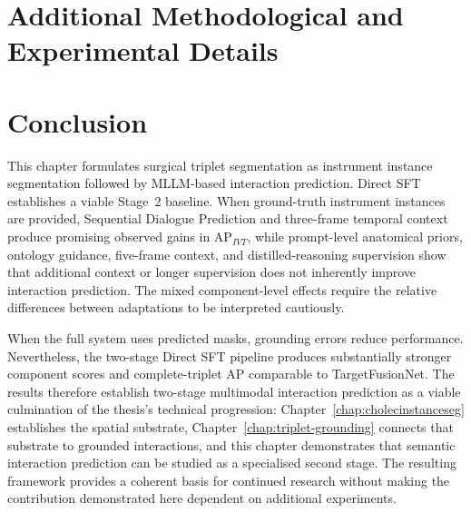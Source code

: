 \section{Additional Methodological and Experimental Details}
\label{sec:c5:additional-details}
\begingroup
\cFiveSupplementtrue
\cFiveTrainingfalse
\cFiveErrorAnalysisfalse

\endgroup

\section{Conclusion}
\label{sec:c5:conclusion}

This chapter formulates surgical triplet segmentation as instrument instance segmentation followed by MLLM-based interaction prediction. Direct SFT establishes a viable Stage~2 baseline. When ground-truth instrument instances are provided, Sequential Dialogue Prediction and three-frame temporal context produce promising observed gains in AP$_{IVT}$, while prompt-level anatomical priors, ontology guidance, five-frame context, and distilled-reasoning supervision show that additional context or longer supervision does not inherently improve interaction prediction. The mixed component-level effects require the relative differences between adaptations to be interpreted cautiously.

When the full system uses predicted masks, grounding errors reduce performance. Nevertheless, the two-stage Direct SFT pipeline produces substantially stronger component scores and complete-triplet AP comparable to TargetFusionNet. The results therefore establish two-stage multimodal interaction prediction as a viable culmination of the thesis's technical progression: Chapter~\ref{chap:cholecinstanceseg} establishes the spatial substrate, Chapter~\ref{chap:triplet-grounding} connects that substrate to grounded interactions, and this chapter demonstrates that semantic interaction prediction can be studied as a specialised second stage. The resulting framework provides a coherent basis for continued research without making the contribution demonstrated here dependent on additional experiments.

